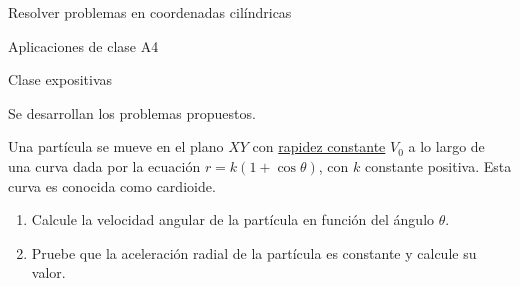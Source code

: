 \documentclass[12pt,letterpaper]{report}
\begin{document}
\fi

\begin{locro}
\item  Resolver problemas en coordenadas cilíndricas
\end{locro}

\begin{contenidos}
\item Aplicaciones de clase A4
\end{contenidos}


\begin{actividad}

Clase expositivas 

Se desarrollan los problemas propuestos.
\end{actividad}


\begin{ejemploclase}{}

 Una partícula se mueve en el plano $XY$ con \underline{rapidez constante} $V_0$ a lo largo de una curva dada por la ecuación $r=k(1+\cos \theta)$, con $k$ constante positiva. Esta curva es conocida como cardioide.

\begin{enumerate}
\item Calcule la velocidad angular de la part\'icula en función del ángulo $\theta$. 
\item Pruebe que la aceleración radial de la partícula es constante y calcule su valor.
\end{enumerate}

\end{ejemploclase} 
\end{document}
